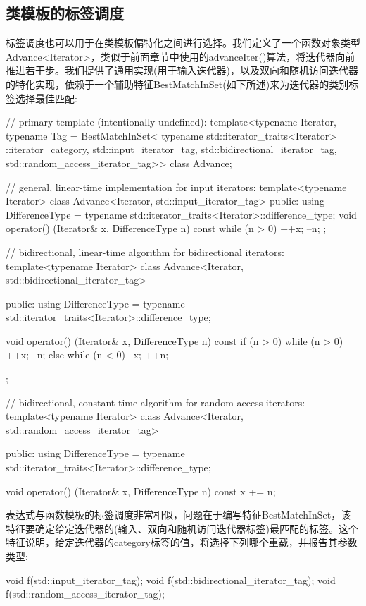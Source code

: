 \subsection{类模板的标签调度}

标签调度也可以用于在类模板偏特化之间进行选择。我们定义了一个函数对象类型Advance<Iterator>，类似于前面章节中使用的advanceIter()算法，将迭代器向前推进若干步。我们提供了通用实现(用于输入迭代器)，以及双向和随机访问迭代器的特化实现，依赖于一个辅助特征BestMatchInSet(如下所述)来为迭代器的类别标签选择最佳匹配:

\begin{cpp}
// primary template (intentionally undefined):
template<typename Iterator,
		typename Tag =
			BestMatchInSet<
				typename std::iterator_traits<Iterator>
							::iterator_category,
				std::input_iterator_tag,
				std::bidirectional_iterator_tag,
				std::random_access_iterator_tag>>
class Advance;

// general, linear-time implementation for input iterators:
template<typename Iterator>
class Advance<Iterator, std::input_iterator_tag>
{
	public:
	using DifferenceType =
	typename std::iterator_traits<Iterator>::difference_type;
	void operator() (Iterator& x, DifferenceType n) const
	{
		while (n > 0) {
			++x;
			--n;
		}
	}
};

// bidirectional, linear-time algorithm for bidirectional iterators:
template<typename Iterator>
class Advance<Iterator, std::bidirectional_iterator_tag>
{
	public:
	using DifferenceType =
		typename std::iterator_traits<Iterator>::difference_type;
		
	void operator() (Iterator& x, DifferenceType n) const
	{
		if (n > 0) {
			while (n > 0) {
				++x;
				--n;
			}
		} else {
			while (n < 0) {
				--x;
				++n;
			}
		}
	}
};

// bidirectional, constant-time algorithm for random access iterators:
template<typename Iterator>
class Advance<Iterator, std::random_access_iterator_tag>
{
	public:
	using DifferenceType =
		typename std::iterator_traits<Iterator>::difference_type;
		
	void operator() (Iterator& x, DifferenceType n) const
	{
		x += n;
	}
}
\end{cpp}

表达式与函数模板的标签调度非常相似，问题在于编写特征BestMatchInSet，该特征要确定给定迭代器的(输入、双向和随机访问迭代器标签)最匹配的标签。这个特征说明，给定迭代器的category标签的值，将选择下列哪个重载，并报告其参数类型:

\begin{cpp}
void f(std::input_iterator_tag);
void f(std::bidirectional_iterator_tag);
void f(std::random_access_iterator_tag);
\end{cpp}


